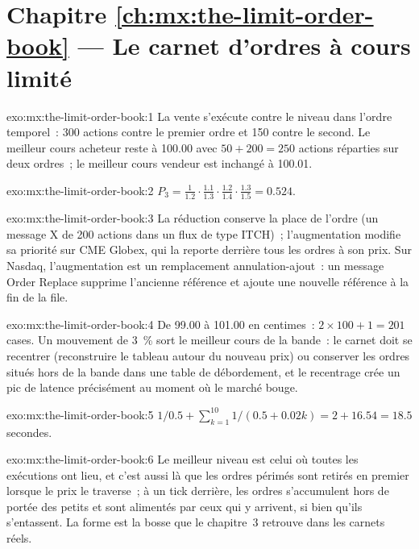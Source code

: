 \section*{Chapitre \ref{ch:mx:the-limit-order-book} --- Le carnet d'ordres à cours limité}

\begin{solution}{exo:mx:the-limit-order-book:1}
La vente s'exécute contre le niveau dans l'ordre temporel~: 300 actions contre le premier ordre et 150 contre le second. Le meilleur cours acheteur reste à 100.00 avec
$50+200=250$ actions réparties sur deux ordres~; le meilleur cours vendeur est inchangé à 100.01.
\end{solution}

\begin{solution}{exo:mx:the-limit-order-book:2}
$P_3=\tfrac{1}{1.2}\cdot\tfrac{1.1}{1.3}\cdot\tfrac{1.2}{1.4}\cdot\tfrac{1.3}{1.5}=0.524$.
\end{solution}

\begin{solution}{exo:mx:the-limit-order-book:3}
La réduction conserve la place de l'ordre (un message X de 200 actions dans un flux de type ITCH)~; l'augmentation modifie sa priorité sur CME Globex, qui la reporte derrière tous les ordres à son prix.
Sur Nasdaq, l'augmentation est un remplacement annulation-ajout~: un message Order Replace supprime l'ancienne référence et ajoute une nouvelle
référence à la fin de la file.
\end{solution}

\begin{solution}{exo:mx:the-limit-order-book:4}
De 99.00 à 101.00 en centimes~: $2\times100+1=201$ cases. Un mouvement de 3~\% sort le meilleur cours de la bande~: le carnet doit se recentrer (reconstruire le tableau
autour du nouveau prix) ou conserver les ordres situés hors de la bande dans une table de débordement, et le recentrage crée un pic de latence précisément au moment où le marché bouge.
\end{solution}

\begin{solution}{exo:mx:the-limit-order-book:5}
$1/0.5+\sum_{k=1}^{10}1/(0.5+0.02k)=2+16.54=18.5$ secondes.
\end{solution}

\begin{solution}{exo:mx:the-limit-order-book:6}
Le meilleur niveau est celui où toutes les exécutions ont lieu, et c'est aussi là que les ordres périmés sont retirés en premier lorsque le prix le traverse~; à un tick
derrière, les ordres s'accumulent hors de portée des petits  et sont alimentés par ceux qui y arrivent, si bien qu'ils s'entassent. La forme est la bosse
que le chapitre~3 retrouve dans les carnets réels.
\end{solution}


